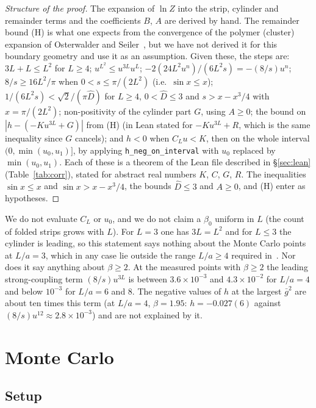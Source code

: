 \documentclass[11pt,a4paper]{article}
\theoremstyle{definition}
\theoremstyle{remark}
\newcommand{\gb}{\bar g^{2}}
\begin{document}
\begin{proof}[Structure of the proof]
The expansion of $\ln Z$ into the strip, cylinder and remainder terms and the coefficients $B$, $A$ are derived by hand. The remainder bound (H) is what one expects from the convergence of the polymer (cluster) expansion of Osterwalder and Seiler~\cite{OS}, but we have not derived it for this boundary geometry and use it as an assumption. Given these, the steps are: $3L+L\le L^2$ for $L\ge4$; $u^{L^2}\le u^{3L}u^L$; $-2(24L^2u^n)/(6L^2s)=-(8/s)u^n$; $8/s\ge16L^2/\pi$ when $0<s\le\pi/(2L^2)$ (i.e.\ $\sin x\le x$); $1/(6L^2s)<\sqrt2/(\pi\hat D)$ for $L\ge4$, $0<\hat D\le3$ and $s>x-x^3/4$ with $x=\pi/(2L^2)$; non-positivity of the cylinder part $G$, using $A\ge0$; the bound on $|h-(-Ku^{3L}+G)|$ from (H) (in Lean stated for $-Ku^{3L}+R$, which is the same inequality since $G$ cancels); and $h<0$ when $C_Lu<K$, then on the whole interval $(0,\min(u_0,u_1)]$, by applying \texttt{h\_neg\_on\_interval} with $u_0$ replaced by $\min(u_0,u_1)$. Each of these is a theorem of the Lean file described in \S\ref{sec:lean} (Table~\ref{tab:corr}), stated for abstract real numbers $K$, $C$, $G$, $R$. The inequalities $\sin x\le x$ and $\sin x>x-x^3/4$, the bounds $\hat D\le3$ and $A\ge0$, and (H) enter as hypotheses.
\end{proof}

We do not evaluate $C_L$ or $u_0$, and we do not claim a $\beta_0$ uniform in $L$ (the count of folded strips grows with $L$). For $L=3$ one has $3L=L^2$ and for $L\le3$ the cylinder is leading, so this statement says nothing about the Monte Carlo points at $L/a=3$, which in any case lie outside the range $L/a\ge4$ required in~\cite[(2.9)]{LSWW}. Nor does it say anything about $\beta\ge2$. At the measured points with $\beta\ge2$ the leading strong-coupling term $(8/s)u^{3L}$ is between $3.6\times10^{-3}$ and $4.3\times10^{-2}$ for $L/a=4$ and below $10^{-3}$ for $L/a=6$ and $8$. The negative values of $h$ at the largest $\gb$ are about ten times this term (at $L/a=4$, $\beta=1.95$: $h=-0.027(6)$ against $(8/s)u^{12}\approx2.8\times10^{-3}$) and are not explained by it.

\section{Monte Carlo}\label{sec:mc}

\subsection{Setup}
\end{document}
